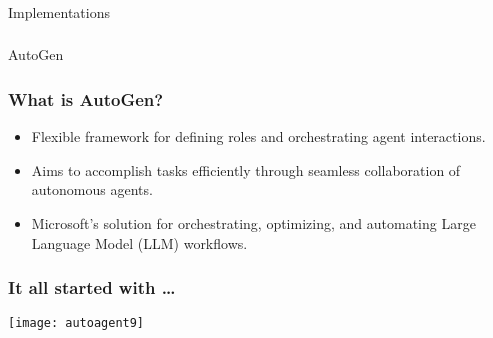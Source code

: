 \begin{frame}[fragile]\frametitle{}
\begin{center}
{\Large Implementations}
\end{center}
\end{frame}

\begin{frame}[fragile]\frametitle{}
\begin{center}
{\Large AutoGen}
\end{center}
\end{frame}

\begin{frame}[fragile]\frametitle{What is AutoGen?}
  \begin{itemize}
    \item Flexible framework for defining roles and orchestrating agent interactions.
    \item Aims to accomplish tasks efficiently through seamless collaboration of autonomous agents.
    \item Microsoft's solution for orchestrating, optimizing, and automating Large Language Model (LLM) workflows.
  \end{itemize}
\end{frame}

\begin{frame}[fragile]\frametitle{It all started with \ldots}
	
	\begin{center}
	\texttt{[image: autoagent9]}
	\end{center}
	
\end{frame}

